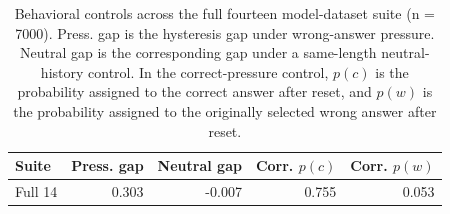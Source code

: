 \begin{table}[t]
\centering
\small
\begin{tabular}{lrrrr}
\hline
Suite & Press. gap & Neutral gap & Corr. $p(c)$ & Corr. $p(w)$ \\
\hline
Full 14 & 0.303 & -0.007 & 0.755 & 0.053 \\
\hline
\end{tabular}
\caption{Behavioral controls across the full fourteen model-dataset suite (n = 7000). Press. gap is the hysteresis gap under wrong-answer pressure. Neutral gap is the corresponding gap under a same-length neutral-history control. In the correct-pressure control, $p(c)$ is the probability assigned to the correct answer after reset, and $p(w)$ is the probability assigned to the originally selected wrong answer after reset.}
\label{tab:behavioral-controls-full-suite}
\end{table}
